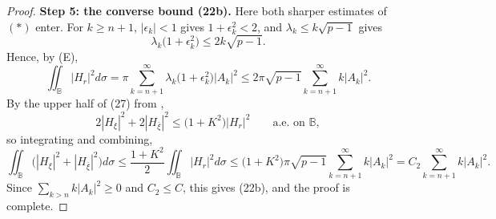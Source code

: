 \begin{proof}
\medskip\noindent\textbf{Step 5: the converse bound (22b).}  Here both sharper
estimates of $(\ast)$ enter.  For $k\ge n+1$, $|\epsilon_k|<1$ gives
$1+\epsilon_k^2<2$, and $\lambda_k\le k\sqrt{p-1}$ gives
\[
  \lambda_k\bigl(1+\epsilon_k^2\bigr)\le 2k\sqrt{p-1}.
\]
Hence, by (E),
\[
  \iint_{\mathbb{B}}|H_r|^2d\sigma
  =\pi\sum_{k=n+1}^{\infty}\lambda_k\bigl(1+\epsilon_k^2\bigr)|A_k|^2
  \le2\pi\sqrt{p-1}\sum_{k=n+1}^{\infty}k|A_k|^2 .
\]
By the upper half of (27) from ,
\[
  2|H_\xi|^2+2|H_{\bar\xi}|^2\le\bigl(1+K^2\bigr)|H_r|^2
  \qquad\text{a.e. on }\mathbb{B},
\]
so integrating and combining,
\[
  \iint_{\mathbb{B}}\bigl(|H_\xi|^2+|H_{\bar\xi}|^2\bigr)d\sigma
  \le\frac{1+K^2}{2}\iint_{\mathbb{B}}|H_r|^2d\sigma
  \le\bigl(1+K^2\bigr)\pi\sqrt{p-1}\sum_{k=n+1}^{\infty}k|A_k|^2
  =C_2\sum_{k=n+1}^{\infty}k|A_k|^2 .
\]
Since $\sum_{k>n}k|A_k|^2\ge0$ and $C_2\le C$, this gives (22b), and the proof
is complete.
\end{proof}
